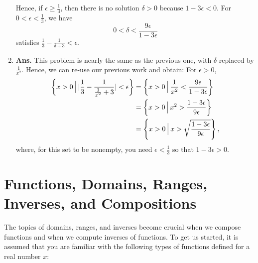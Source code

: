 \begin{enumerate}
Hence, if $\epsilon \ge \frac{1}{3}$, then there is no solution $\delta > 0$ because $1 - 3 \epsilon < 0$. For  $0< \epsilon < \frac{1}{3}$, we have 
$$0< \delta < \frac{ 9 \epsilon} {1 - 3 \epsilon} $$
satisfies $ \frac{1}{3} - \frac{1}{\delta + 3 } < \epsilon $.

\item  \textbf{Ans.} This problem is nearly the same as the previous one, with $\delta$ replaced by $\frac{1}{x^2}$. Hence, we can re-use our previous work and obtain: For $\epsilon > 0$, 
\begin{align*}
    \left\{ x>0~\vrule height .4cm depth 0.2cm ~ |\frac{1}{3} - \frac{1}{\frac{1}{x^2} + 3 }|  < \epsilon\right\} &= \left\{ x>0~\vrule height .4cm depth 0.2cm ~ \frac{1}{x^2} < \frac{9 \epsilon}{1 - 3 \epsilon} \right\} \\
    & = \left\{ x>0~\vrule height .4cm depth 0.2cm ~ x^2 >   \frac{1 - 3 \epsilon}{9 \epsilon} \right\} \\
    & =  \left\{ x>0~\vrule height .4cm depth 0.2cm ~ x >  \sqrt{\frac{1 - 3 \epsilon}{9 \epsilon}} \right\},
\end{align*}
where, for this set to be nonempty, you need $\epsilon < \frac{1}{3}$ so that $1 - 3 \epsilon > 0$. \\

\end{enumerate} 

\bigskip




\Qed

\section{Functions, Domains, Ranges, Inverses, and Compositions}

The topics of domains, ranges, and inverses become crucial when we compose functions and when we compute inverses of functions. To get us started, it is assumed that you are familiar with the following types of functions defined for a real number $x$:

